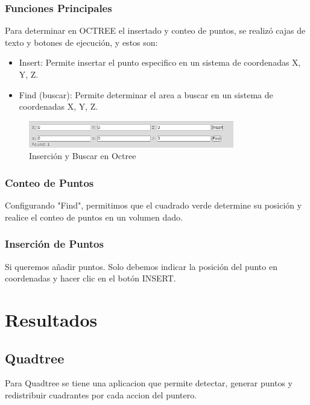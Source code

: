 \documentclass{article}
\begin{document}
\subsubsection{Funciones Principales}

Para determinar en OCTREE el insertado y conteo de puntos, se realizó cajas de texto y botones de ejecución, y estos son:

\begin{itemize}
    \item Insert: Permite insertar el punto especifico en un sistema de coordenadas X, Y, Z.
    \item Find (buscar): Permite determinar el area a buscar en un sistema de coordenadas X, Y, Z.
\end{itemize}

\begin{figure}[H]
\centering
\includegraphics[width=0.8\textwidth]{img/oct_insertfind.png}
\caption{Inserción y Buscar en Octree}
\end{figure}

\subsubsection{Conteo de Puntos}
Configurando "Find", permitimos que el cuadrado verde determine su posición y realice el conteo de puntos en un volumen dado.

\subsubsection{Inserción de Puntos}
Si queremos añadir puntos. Solo debemos indicar la posición del punto en coordenadas y hacer clic en el botón INSERT.


\section{Resultados}

\subsection{Quadtree}

Para Quadtree se tiene una aplicacion que permite detectar, generar puntos y redistribuir cuadrantes por cada accion del puntero. 
\end{document}
